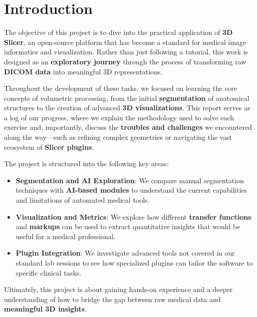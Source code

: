 \section*{Introduction}

The objective of this project is to dive into the practical application of \textbf{3D Slicer}, 
an open-source platform that has become a standard for medical image informatics and 
visualization. Rather than just following a tutorial, this work is designed as 
an \textbf{exploratory journey} through the process of transforming raw \textbf{DICOM data} 
into meaningful 3D representations.

Throughout the development of these tasks, we focused on learning the core concepts of 
volumetric processing, from the initial \textbf{segmentation} of anatomical structures 
to the creation of advanced \textbf{3D visualizations}. This report serves as a log of 
our progress, where we explain the methodology used to solve each exercise and, importantly, 
discuss the \textbf{troubles and challenges} we encountered along the way—such as refining 
complex geometries or navigating the vast ecosystem of \textbf{Slicer plugins}.

The project is structured into the following key areas:
\begin{itemize}
    \item \textbf{Segmentation and AI Exploration}: We compare manual segmentation techniques 
    with \textbf{AI-based modules} to understand the current capabilities and limitations of 
    automated medical tools.
    \item \textbf{Visualization and Metrics}: We explore how different \textbf{transfer functions} 
    and \textbf{markups} can be used to extract quantitative insights that would be useful for a 
    medical professional.
    \item \textbf{Plugin Integration}: We investigate advanced tools not covered in our standard 
    lab sessions to see how specialized plugins can tailor the software to specific clinical 
    tasks.
\end{itemize}

Ultimately, this project is about gaining hands-on experience and a deeper understanding of 
how to bridge the gap between raw medical data and \textbf{meaningful 3D insights}.